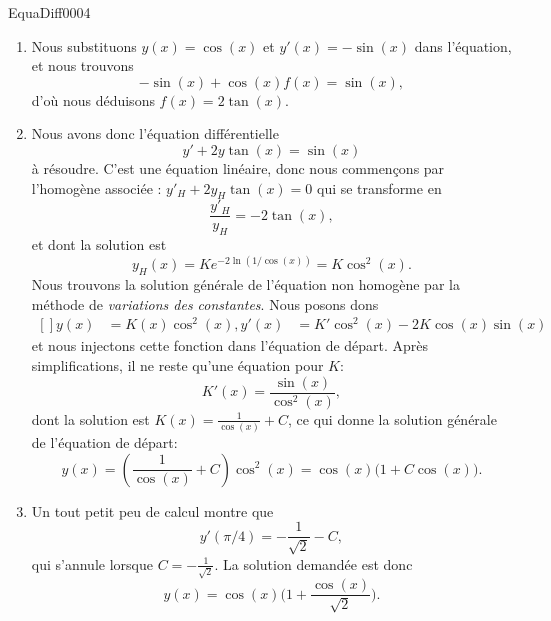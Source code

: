 \begin{corrige}{EquaDiff0004}

\begin{enumerate}

\item
Nous substituons $y(x)=\cos(x)$ et $y'(x)=-\sin(x)$ dans l'équation, et nous trouvons
\begin{equation}
	-\sin(x)+\cos(x)f(x)=\sin(x),
\end{equation}
d'où nous déduisons $f(x)=2\tan(x)$.

\item
Nous avons donc l'équation différentielle
\begin{equation}
	y'+2y\tan(x)=\sin(x)
\end{equation}
à résoudre. C'est une équation linéaire, donc nous commençons par l'homogène associée : $y'_H+2y_H\tan(x)=0$ qui se transforme en
\begin{equation}
	\frac{ y'_H }{ y_H }=-2\tan(x),
\end{equation}
et dont la solution est
\begin{equation}
	y_H(x)=K e^{-2\ln(1/\cos(x))}=K\cos^2(x).
\end{equation}
Nous trouvons la solution générale de l'équation non homogène par la méthode de \emph{variations des constantes}. Nous posons dons
\begin{equation}
	\begin{aligned}[]
		y(x)&=K(x)\cos^2(x),
		y'(x)&=K'\cos^2(x)-2K\cos(x)\sin(x)
	\end{aligned}
\end{equation}
et nous injectons cette fonction dans l'équation de départ. Après simplifications, il ne reste qu'une équation pour $K$:
\begin{equation}
	K'(x)=\frac{ \sin(x) }{ \cos^2(x) },
\end{equation}
dont la solution est $K(x)=\frac{1}{ \cos(x) }+C$, ce qui donne la solution générale de l'équation de départ:
\begin{equation}
	y(x)=\left( \frac{1}{ \cos(x) }+C \right)\cos^2(x)=\cos(x)\big( 1+C\cos(x) \big).
\end{equation}

\item
Un tout petit peu de calcul montre que 
\begin{equation}
	y'(\pi/4)=-\frac{1}{ \sqrt{2} }-C,
\end{equation}
qui s'annule lorsque $C=-\frac{1}{ \sqrt{2} }$. La solution demandée est donc
\begin{equation}
	y(x)=\cos(x)\big( 1+\frac{ \cos(x) }{ \sqrt{2} } \big).
\end{equation}

\end{enumerate}

\end{corrige}
